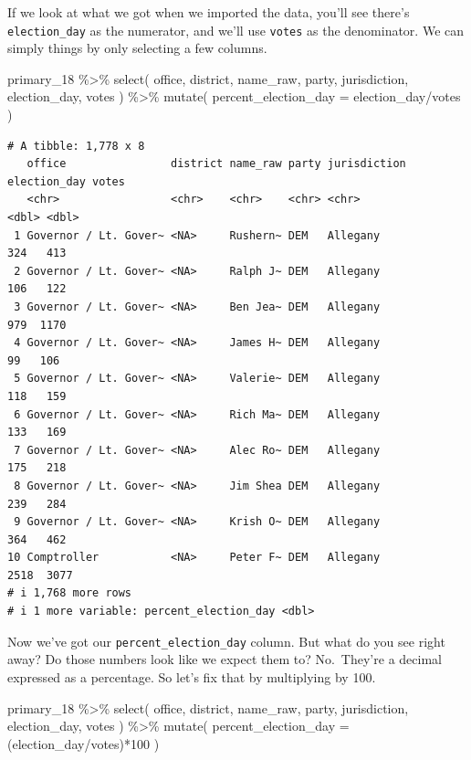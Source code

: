 \documentclass[
  letterpaper,
  DIV=11,
  numbers=noendperiod]{scrreprt}
\newenvironment{Shaded}{\begin{snugshade}}{\end{snugshade}}
\newcommand{\AttributeTok}[1]{\textcolor[rgb]{0.40,0.45,0.13}{#1}}
\newcommand{\DecValTok}[1]{\textcolor[rgb]{0.68,0.00,0.00}{#1}}
\newcommand{\FunctionTok}[1]{\textcolor[rgb]{0.28,0.35,0.67}{#1}}
\newcommand{\NormalTok}[1]{\textcolor[rgb]{0.00,0.23,0.31}{#1}}
\newcommand{\SpecialCharTok}[1]{\textcolor[rgb]{0.37,0.37,0.37}{#1}}
\begin{document}
If we look at what we got when we imported the data, you'll see there's
\texttt{election\_day} as the numerator, and we'll use \texttt{votes} as
the denominator. We can simply things by only selecting a few columns.

\begin{Shaded}
\begin{Highlighting}[]
\NormalTok{primary\_18 }\SpecialCharTok{\%\textgreater{}\%}
  \FunctionTok{select}\NormalTok{(}
\NormalTok{    office, district, name\_raw, party, jurisdiction, election\_day, votes}
\NormalTok{    ) }\SpecialCharTok{\%\textgreater{}\%}
  \FunctionTok{mutate}\NormalTok{(}
  \AttributeTok{percent\_election\_day =}\NormalTok{ election\_day}\SpecialCharTok{/}\NormalTok{votes}
\NormalTok{    )}
\end{Highlighting}
\end{Shaded}

\begin{verbatim}
# A tibble: 1,778 x 8
   office                district name_raw party jurisdiction election_day votes
   <chr>                 <chr>    <chr>    <chr> <chr>               <dbl> <dbl>
 1 Governor / Lt. Gover~ <NA>     Rushern~ DEM   Allegany              324   413
 2 Governor / Lt. Gover~ <NA>     Ralph J~ DEM   Allegany              106   122
 3 Governor / Lt. Gover~ <NA>     Ben Jea~ DEM   Allegany              979  1170
 4 Governor / Lt. Gover~ <NA>     James H~ DEM   Allegany               99   106
 5 Governor / Lt. Gover~ <NA>     Valerie~ DEM   Allegany              118   159
 6 Governor / Lt. Gover~ <NA>     Rich Ma~ DEM   Allegany              133   169
 7 Governor / Lt. Gover~ <NA>     Alec Ro~ DEM   Allegany              175   218
 8 Governor / Lt. Gover~ <NA>     Jim Shea DEM   Allegany              239   284
 9 Governor / Lt. Gover~ <NA>     Krish O~ DEM   Allegany              364   462
10 Comptroller           <NA>     Peter F~ DEM   Allegany             2518  3077
# i 1,768 more rows
# i 1 more variable: percent_election_day <dbl>
\end{verbatim}

Now we've got our \texttt{percent\_election\_day} column. But what do
you see right away? Do those numbers look like we expect them to?
No.~They're a decimal expressed as a percentage. So let's fix that by
multiplying by 100.

\begin{Shaded}
\begin{Highlighting}[]
\NormalTok{primary\_18 }\SpecialCharTok{\%\textgreater{}\%}
  \FunctionTok{select}\NormalTok{(}
\NormalTok{    office, district, name\_raw, party, jurisdiction, election\_day, votes}
\NormalTok{    ) }\SpecialCharTok{\%\textgreater{}\%}
  \FunctionTok{mutate}\NormalTok{(}
  \AttributeTok{percent\_election\_day =}\NormalTok{ (election\_day}\SpecialCharTok{/}\NormalTok{votes)}\SpecialCharTok{*}\DecValTok{100}
\NormalTok{    )}
\end{Highlighting}
\end{Shaded}
\end{document}
